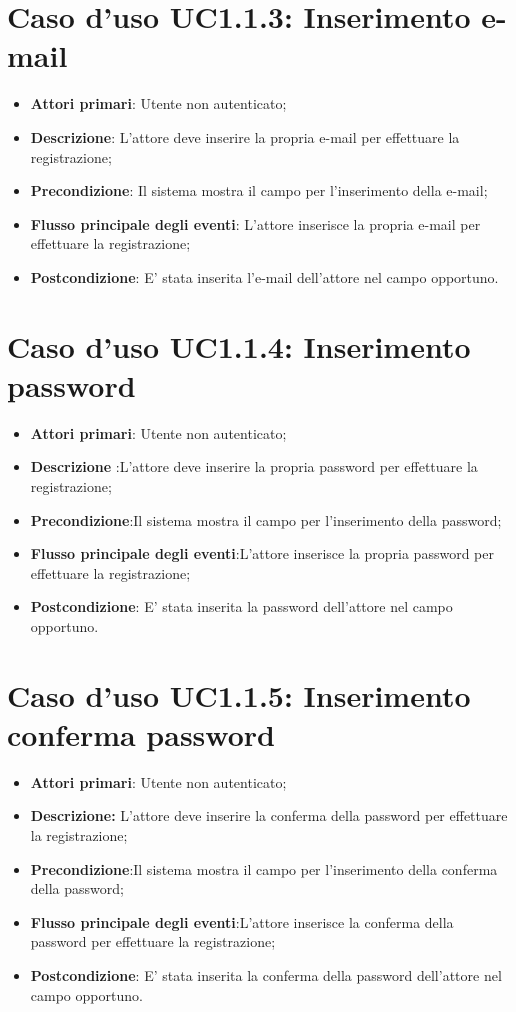 		\section{Caso d'uso UC1.1.3: Inserimento e-mail}
		\begin{itemize}
			\item \textbf{Attori primari}: Utente non autenticato;
			\item \textbf{Descrizione}: L'attore deve inserire la propria e-mail per effettuare la  registrazione;
			\item \textbf{Precondizione}: Il sistema mostra il campo per l'inserimento della e-mail;
			\item \textbf{Flusso principale degli eventi}: L'attore inserisce la propria e-mail per effettuare la registrazione;
			\item \textbf{Postcondizione}: E' stata inserita l'e-mail dell'attore nel campo opportuno.
		\end{itemize}
		\section{Caso d'uso UC1.1.4: Inserimento password}
		\begin{itemize}
			\item \textbf{Attori primari}: Utente non autenticato;
			\item \textbf{Descrizione} :L'attore deve inserire la propria password per effettuare la registrazione;
			\item \textbf{Precondizione}:Il sistema mostra il campo per l'inserimento della password;
			\item \textbf{Flusso principale degli eventi}:L'attore inserisce la propria password per effettuare la registrazione;
			\item \textbf{Postcondizione}: E' stata inserita la password dell'attore nel campo opportuno.
		\end{itemize}
		\section{Caso d'uso UC1.1.5: Inserimento conferma password}
		\begin{itemize}
			\item \textbf{Attori primari}: Utente non autenticato;
			\item \textbf{Descrizione:} L'attore deve inserire la conferma della password per effettuare la registrazione;
			\item \textbf{Precondizione}:Il sistema mostra il campo per l'inserimento della conferma della password;
			\item \textbf{Flusso principale degli eventi}:L'attore inserisce la conferma della password per effettuare la registrazione;
			\item \textbf{Postcondizione}: E' stata inserita la conferma della password dell'attore nel campo opportuno.
		\end{itemize}
